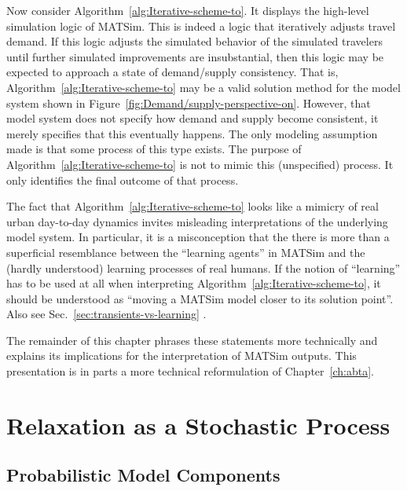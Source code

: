 Now consider Algorithm~\ref{alg:Iterative-scheme-to}. It displays
the high-level simulation logic of MATSim. This is indeed a logic
that iteratively adjusts travel demand. If this logic adjusts the
simulated behavior of the simulated travelers until further simulated
improvements are insubstantial, then this logic may be expected to
approach a state of demand/supply consistency. That is, Algorithm~\ref{alg:Iterative-scheme-to}
may be a valid solution method for the model system shown in Figure~\ref{fig:Demand/supply-perspective-on}.
However, that model system does not specify how demand and supply
become consistent, it merely specifies that this eventually happens.
The only modeling assumption made is that some process of this type
exists. The purpose of Algorithm~\ref{alg:Iterative-scheme-to} is
not to mimic this (unspecified) process. It only identifies the final
outcome of that process.

The fact that Algorithm~\ref{alg:Iterative-scheme-to} looks like
a mimicry of real urban day-to-day dynamics invites misleading interpretations
of the underlying model system. In particular, it is a misconception
that the there is more than a superficial resemblance between the
{}``learning agents'' in MATSim and the (hardly understood) learning
processes of real humans. If the notion of {}``learning'' has to
be used at all when interpreting Algorithm~\ref{alg:Iterative-scheme-to},
it should be understood as {}``moving a MATSim model closer to its
solution point''.  Also see Sec.~\ref{sec:transients-vs-learning} .

The remainder of this chapter phrases these statements more technically and explains its implications for the interpretation of MATSim outputs.  This presentation is in parts a more technical reformulation of Chapter~\ref{ch:abta}.


\section{\label{sec:Relaxation-as-a}Relaxation as a Stochastic Process}


\subsection{\label{sub:Probabilistic-model-components}Probabilistic Model Components}

